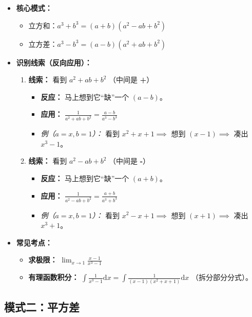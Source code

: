 \documentclass[lang=cn,math=mtpro2,11pt,scheme=chinese]{elegantbook}
\begin{document}
\begin{itemize}
    \item \textbf{核心模式：}
    \begin{itemize}
        \item 立方和：$a^3 + b^3 = (a + b)(a^2 - ab + b^2)$
        \item 立方差：$a^3 - b^3 = (a - b)(a^2 + ab + b^2)$
    \end{itemize}

    \item \textbf{识别线索（反向应用）：}
    \begin{enumerate}
        \item \textbf{线索：} 看到 $a^2 + ab + b^2$ （中间是 \textbf{+}）
        \begin{itemize}
            \item \textbf{反应：} 马上想到它“缺”一个 $(a - b)$。
            \item \textbf{应用：} $\frac{1}{a^2 + ab + b^2} = \frac{a-b}{a^3 - b^3}$
            \item \textit{例（$a=x, b=1$）：} 看到 $x^2 + x + 1 \implies$ 想到 $(x-1) \implies$ 凑出 $x^3 - 1$。
        \end{itemize}
        
        \item \textbf{线索：} 看到 $a^2 - ab + b^2$ （中间是 \textbf{-}）
        \begin{itemize}
            \item \textbf{反应：} 马上想到它“缺”一个 $(a + b)$。
            \item \textbf{应用：} $\frac{1}{a^2 - ab + b^2} = \frac{a+b}{a^3 + b^3}$
            \item \textit{例（$a=x, b=1$）：} 看到 $x^2 - x + 1 \implies$ 想到 $(x+1) \implies$ 凑出 $x^3 + 1$。
        \end{itemize}
    \end{enumerate}

    \item \textbf{常见考点：}
    \begin{itemize}
        \item \textbf{求极限：} $\lim_{x \to 1} \frac{x-1}{x^3-1}$
        \item \textbf{有理函数积分：} $\int \frac{1}{x^3 - 1} \mathrm{d}x = \int \frac{1}{(x-1)(x^2+x+1)} \mathrm{d}x$ （拆分部分分式）。
    \end{itemize}
\end{itemize}

\subsection{模式二：平方差}
\end{document}
